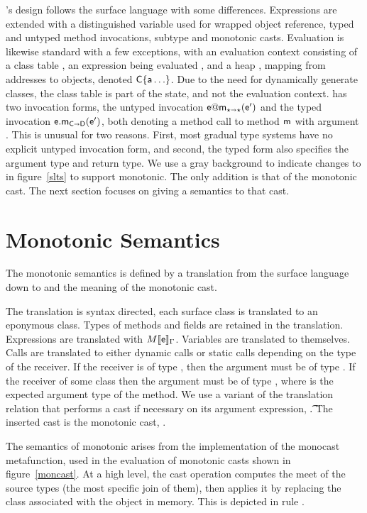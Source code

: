 \documentclass[sigconf]{acmart}
\begin{document}
\kafka's design follows the surface language with some differences.
Expressions are extended with \that a distinguished variable used for
wrapped object reference, typed and untyped method invocations, subtype and
monotonic casts.  Evaluation is likewise standard with a few exceptions,
with an evaluation context consisting of a class table \K, an expression
being evaluated \e, and a heap \s, mapping from addresses \a to objects,
denoted $\C\{\a\ldots\}$. Due to the need for dynamically generate classes,
the class table \K is part of the state, and not the evaluation context.
\kafka has two invocation forms, the untyped invocation $\DynCall\e\m\ep$
and the typed invocation $\KCall\e\m\ep{\C}{\D}$, both denoting a method
call to method ${\sf{m}}$ with argument \ep. This is unusual for two
reasons. First, most gradual type systems have no explicit untyped
invocation form, and second, the typed form also specifies the argument type
and return type.
We use a gray background to indicate changes to \kafka in figure~\ref{slts} to
support monotonic. The only addition is that of the monotonic cast. The next
section focuses on giving a semantics to that cast.


\section{Monotonic Semantics}

The monotonic semantics is defined by a translation from the surface
language down to \kafka and the meaning of the monotonic cast. 

The translation is syntax directed, each surface class is translated to an
eponymous \kafka class. Types of methods and fields are retained in the
translation. Expressions are translated with $\TRG[M]{\e}\Env$. Variables
are translated to themselves. Calls are translated to either dynamic calls
or static calls depending on the type of the receiver.  If the receiver is
of type \any, then the argument must be of type \any. If the receiver of
some class \C then the argument must be of type \D, where \D is the expected
argument type of the method.  We use a variant of the translation relation
that performs a cast if necessary on its argument expression,
\TAG[M]{\e}{\Env}\t.  The inserted cast is the monotonic cast,
\MonCast{\t}{\ep}.

The semantics of monotonic arises from the implementation of the monocast
metafunction, used in the evaluation of monotonic casts shown in
figure~\ref{moncast}. At a high level, the cast operation computes the
meet of the source types (the most specific join of them), then applies it
by replacing the class associated with the object in memory. This is depicted
in rule .
\end{document}
